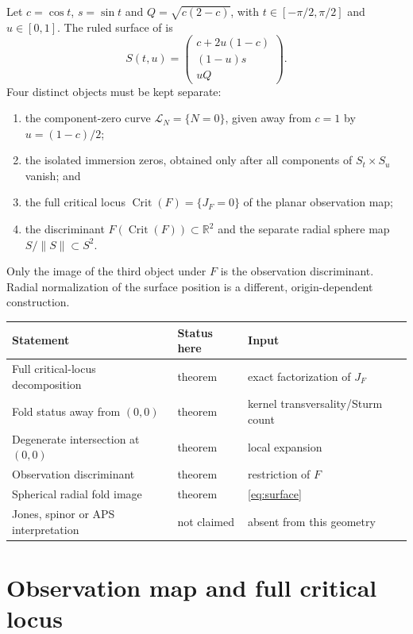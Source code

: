 \documentclass[11pt]{article}
\theoremstyle{definition}
\newcommand{\LN}{\mathcal L_N}
\begin{document}
Let $c=\cos t$, $s=\sin t$ and
$Q=\sqrt{c(2-c)}$, with
$t\in[-\pi/2,\pi/2]$ and $u\in[0,1]$.  The ruled surface of
\cite{hayami2026surface} is
\begin{equation}\label{eq:surface}
S(t,u)=
\begin{pmatrix}
c+2u(1-c)\\
(1-u)s\\
uQ
\end{pmatrix}.
\end{equation}
Four distinct objects must be kept separate:
\begin{enumerate}
  \item the component-zero curve
        $\LN=\{N=0\}$, given away from $c=1$ by
        $u=(1-c)/2$;
  \item the isolated immersion zeros, obtained only after all components of
        $S_t\times S_u$ vanish; and
  \item the full critical locus $\operatorname{Crit}(F)=\{J_F=0\}$ of the
        planar observation map;
  \item the discriminant $F(\operatorname{Crit}(F))\subset\mathbb R^2$ and
        the separate radial sphere map $S/\lVert S\rVert\subset S^2$.
\end{enumerate}
Only the image of the third object under $F$ is the observation
discriminant.  Radial normalization of the surface position is a different,
origin-dependent construction.

\begin{center}
\begin{tabular}{@{}p{}p{}p{}@{}}
\toprule
Statement & Status here & Input\\
\midrule
Full critical-locus decomposition & theorem & exact factorization of $J_F$\\
Fold status away from $(0,0)$ & theorem & kernel transversality/Sturm count\\
Degenerate intersection at $(0,0)$ & theorem & local expansion\\
Observation discriminant & theorem & restriction of $F$\\
Spherical radial fold image & theorem & \eqref{eq:surface}\\
\addlinespace[2pt]
Jones, spinor or APS interpretation & not claimed & absent from this geometry\\
\bottomrule
\end{tabular}
\end{center}

\section{Observation map and full critical locus}
\end{document}
